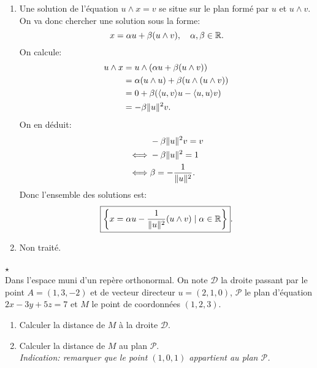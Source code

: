 {\begin{td-sol}[]
\begin{enumerate}
			\item Une solution de l'équation \(u \wedge x = v\) se situe sur 
			le plan formé par \(u\) et \(u \wedge v\). On va donc chercher une 
			solution sous la forme:
			\begin{equation*}
				x = \alpha u + \beta (u \wedge v),\quad \alpha, \beta \in \mathbb{R}.
			\end{equation*}
			On calcule:
			\begin{equation*}
				\begin{aligned}
					u \wedge x
					&= u \wedge (\alpha u + \beta (u \wedge v))\\
					&= \alpha (u \wedge u) + \beta (u \wedge (u \wedge v))\\
					&= 0 + \beta (\langle u,v \rangle u - \langle u,u \rangle v)\\
					&= -\beta \mathopen{}\left\|u\right\|\mathclose{}^2 v.
				\end{aligned}
			\end{equation*}
			On en déduit:
			\begin{equation*}
				\begin{aligned}
					&-\beta \mathopen{}\left\|u\right\|\mathclose{}^2 v = v\\
					\iff& -\beta \mathopen{}\left\|u\right\|\mathclose{}^2 = 1\\
					\iff& \beta = -\frac{1}{\mathopen{}\left\|u\right\|\mathclose{}^2}.
				\end{aligned}
			\end{equation*}
			Donc l'ensemble des solutions est:
			\begin{equation*}
				\boxed{\left\{x = \alpha u - \frac{1}{\mathopen{}\left\|u\right\|\mathclose{}^2}(u \wedge v) \mid \alpha \in \mathbb{R}\right\}}.
			\end{equation*}

			\item Non traité.
		\end{enumerate}
	\end{td-sol}
}{}


\begin{td-exo}[] \(\star\) \,\\%
	Dans l'espace muni d'un repère orthonormal. 
	On note \(\mathcal D\) la droite passant par le point \(A = (1, 3, -2)\) et
	de vecteur directeur \(u = (2, 1, 0)\), 
	\(\mathcal P\) le plan d'équation \(2x - 3y + 5z= 7\) et 
	\(M\) le point de coordonnées \((1, 2, 3)\).

	\begin{enumerate}
		\item Calculer la distance de \(M\) à la droite \(\mathcal D\).

		\item Calculer la distance de \(M\) au plan \(\mathcal P\).\\
		\textit{Indication: remarquer que le point \((1, 0, 1)\) appartient au plan \(\mathcal P\).}
	\end{enumerate}
\end{td-exo}

